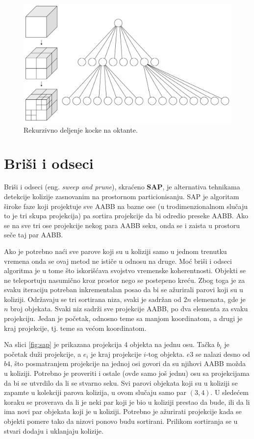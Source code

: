 \documentclass[12pt,oneside]{memoir}
\begin{document}
\begin{figure}[h!]
	\begin{center}
	\includegraphics[scale=0.22]{octree.png}
	\end{center}
	\caption{Rekurzivno deljenje kocke na oktante.}
	\label{fig:oct}
\end{figure}

\section{Briši i odseci}
\label{subsec:sap}

Briši i odseci (eng. {\em sweep and prune}), skraćeno \textbf{SAP}, je alternativa tehnikama detekcije kolizije 
zasnovanim na prostornom particionisanju.
SAP je algoritam široke faze koji projektuje sve AABB
na bazne ose (u trodimenzionalnom slučaju to je tri skupa projekcija) pa sortira projekcije da bi odredio preseke AABB.
Ako se na sve tri ose projekcije nekog para AABB seku, onda se i zaista u prostoru seče taj par AABB.

Ako je potrebno naći sve parove koji su u koliziji samo u jednom trenutku vremena onda se ovaj metod ne ističe u odnosu na druge.
Moć briši i odseci algoritma je u tome što iskorišćava svojstvo vremenske koherentnosti. 
Objekti se ne teleportuju nasumično kroz prostor nego se postepeno kreću. 
Zbog toga je za svaku iteraciju potreban inkrementalan posao da bi se ažurirali parovi koji su u koliziji.
Održavaju se tri sortirana niza, svaki je sadržan od $2n$ elemenata, gde je $n$ broj objekata.
Svaki niz sadrži sve projekcije AABB, po dva elementa za svaku projekciju. 
Jedan je početak, odnosno teme sa manjom koordinatom, a drugi je kraj projekcije, tj. teme sa većom koordinatom. 

Na slici \ref{fig:sap} je prikazana projekcija 4 objekta na jednu osu. 
Tačka $b_i$ je početak duži projekcije, a $e_i$ je kraj projekcije $i$-tog objekta.
$e3$ se nalazi desno od $b4$, što posmatranjem projekcije na jednoj osi govori da su njihovi AABB možda u koliziji.
Potrebno je proveriti i ostale (ovde samo još jednu) osu sa projekcijama da bi se utvrdilo da li se stvarno seku.
Svi parovi objekata koji su u koliziji se zapamte u kolekciji parova kolizija, u ovom slučaju samo par $(3, 4)$.
U sledećem koraku se proverava da li je neki par koji je bio u koliziji prestao da bude, ili da li ima novi par objekata koji je u koliziji.
Potrebno je ažurirati projekcije kada se objekti pomere tako da nizovi ponovo budu sortirani. Prilikom sortiranja se u stvari dodaju i uklanjaju kolizije.
\end{document}
